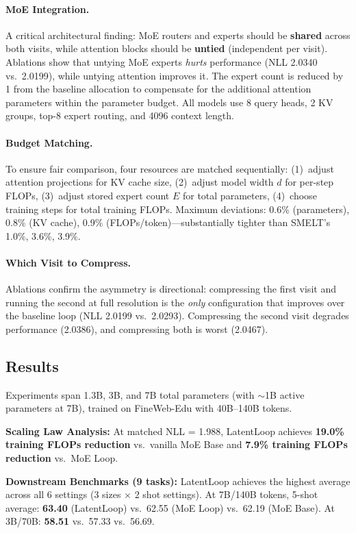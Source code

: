 \documentclass[11pt,a4paper]{article}
\begin{document}
\paragraph{MoE Integration.}
A critical architectural finding: MoE routers and experts should be \textbf{shared} across both visits, while attention blocks should be \textbf{untied} (independent per visit). Ablations show that untying MoE experts \emph{hurts} performance (NLL 2.0340 vs.\ 2.0199), while untying attention improves it. The expert count is reduced by 1 from the baseline allocation to compensate for the additional attention parameters within the parameter budget. All models use 8 query heads, 2 KV groups, top-8 expert routing, and 4096 context length.

\paragraph{Budget Matching.}
To ensure fair comparison, four resources are matched sequentially: (1)~adjust attention projections for KV cache size, (2)~adjust model width $d$ for per-step FLOPs, (3)~adjust stored expert count $E$ for total parameters, (4)~choose training steps for total training FLOPs. Maximum deviations: 0.6\% (parameters), 0.8\% (KV cache), 0.9\% (FLOPs/token)---substantially tighter than SMELT's 1.0\%, 3.6\%, 3.9\%.

\paragraph{Which Visit to Compress.}
Ablations confirm the asymmetry is directional: compressing the first visit and running the second at full resolution is the \emph{only} configuration that improves over the baseline loop (NLL 2.0199 vs.\ 2.0293). Compressing the second visit degrades performance (2.0386), and compressing both is worst (2.0467).

\subsection{Results}
Experiments span 1.3B, 3B, and 7B total parameters (with $\sim$1B active parameters at 7B), trained on FineWeb-Edu with 40B--140B tokens.

\textbf{Scaling Law Analysis:} At matched NLL = 1.988, LatentLoop achieves \textbf{19.0\% training FLOPs reduction} vs.\ vanilla MoE Base and \textbf{7.9\% training FLOPs reduction} vs.\ MoE Loop.

\textbf{Downstream Benchmarks (9 tasks):} LatentLoop achieves the highest average across all 6 settings (3 sizes $\times$ 2 shot settings). At 7B/140B tokens, 5-shot average: \textbf{63.40} (LatentLoop) vs.\ 62.55 (MoE Loop) vs.\ 62.19 (MoE Base). At 3B/70B: \textbf{58.51} vs.\ 57.33 vs.\ 56.69.
\end{document}
